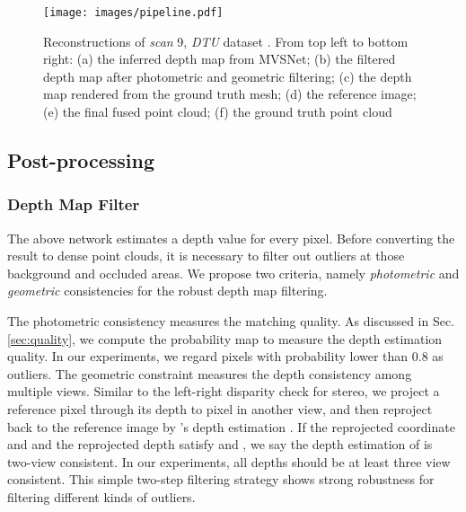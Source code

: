 \documentclass[runningheads]{llncs}
\begin{document}
\begin{figure}[!t]
  \centering
  \texttt{[image: images/pipeline.pdf]}
  \caption{Reconstructions of \textit{scan} 9, \textit{DTU} dataset \cite{aanaes2016large}. From top left to bottom right: (a) the inferred depth map from MVSNet; (b) the filtered depth map after photometric and geometric filtering; (c) the depth map rendered from the ground truth mesh; (d) the reference image; (e) the final fused point cloud; (f) the ground truth point cloud}
  \label{fig:pipeline}
\end{figure}



\subsection{Post-processing}

\subsubsection{Depth Map Filter} \label{sec:filter} The above network estimates a depth value for every pixel. Before converting the result to dense point clouds, it is necessary to filter out outliers at those background and occluded areas. We propose two criteria, namely \textit{photometric} and \textit{geometric} consistencies for the robust depth map filtering. 
	
The photometric consistency measures the matching quality. As discussed in Sec. \ref{sec:quality}, we compute the probability map to measure the depth estimation quality. In our experiments, we regard pixels with probability lower than 0.8 as outliers. The geometric constraint measures the depth consistency among multiple views. Similar to the left-right disparity check for stereo, we project a reference pixel  through its depth  to pixel  in another view, and then reproject  back to the reference image by 's depth estimation . If the reprojected coordinate  and and the reprojected depth  satisfy  and , we say the depth estimation  of  is two-view consistent. In our experiments, all depths should be at least three view consistent. This simple two-step filtering strategy shows strong robustness for filtering different kinds of outliers.
\end{document}
